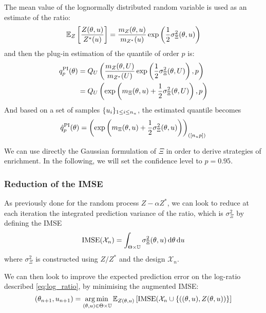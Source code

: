 \documentclass[../../Main_ManuscritThese.tex]{subfiles}
\begin{document}
The mean value of the lognormally distributed random variable is used
as an estimate of the ratio:
\begin{equation}
  \label{eq:mean_ratio_logn}
\mathbb{E}_Z\left[\frac{Z(\theta, u)}{Z^*(u)}\right] = \frac{m_Z(\theta, u)}{m_{Z^*}(u)}\exp\left(\frac{1}{2}\sigma^2_{\Xi}(\theta, u)\right) 
\end{equation}
and then the plug-in estimation of the quantile of
order $p$ is:
\begin{align}
  {q}^{\mathrm{PI}}_p(\theta) &= Q_{U}\left(\frac{m_Z(\theta, U)}{m_{Z^*}(U)}\exp\left(\frac{1}{2}\sigma^2_{\Xi}(\theta, U)\right),p \right)\\ &= Q_{U}\left(\exp\left(m_{\Xi}(\theta, u)+\frac{1}{2}\sigma^2_{\Xi}(\theta, U)\right),p \right)
\end{align}
And based on a set of samples $\{u_i\}_{1\leq i \leq n_{u}}$, the estimated quantile becomes
\begin{equation}
  \hat{q}^{\mathrm{PI}}_p(\theta) = {\left(\exp\left(m_{\Xi}(\theta, u)+\frac{1}{2}\sigma^2_{\Xi}(\theta, u)\right)\right)}_{\left(\left[n_{u}p\right]\right)}
\end{equation}


We can use directly the Gaussian formulation of $\Xi$ in order to
derive strategies of enrichment. In the following, we will set the
confidence level to $p=0.95$.
  
  \subsubsection{Reduction of the IMSE}
  \label{ssec:reduction_imse_quantile}
  As previously done for the random process $Z - \alpha Z^*$, we can
  look to reduce at each iteration the integrated prediction variance
  of the ratio, which is $\sigma^2_{\Xi}$ by defining the IMSE
\begin{equation}
  \operatorname{\mathrm{IMSE}}(\mathcal{X}_n) = \int_{\Theta\times\mathbb{U}} \sigma_{\Xi}^2(\theta, u) \,\mathrm{d}\theta\,\mathrm{d}u
\end{equation}
where $\sigma_\Xi^2$ is constructed using $Z/Z^*$ and the design $\mathcal{X}_n$.

We can then look to improve the expected prediction error on the
log-ratio described \cref{eq:log_ratio}, by minimising the augmented
IMSE:
\begin{equation}
  \label{eq:aIMSE_Xi}
 (\theta_{n+1}, u_{n+1}) = \operatorname*{arg\,min \,}_{(\theta, u) \in \Theta \times \mathbb{U}}\mathbb{E}_{Z(\theta,u)}\left[\operatorname{\mathrm{IMSE}}(\mathcal{X}_n \cup \left\{\left((\theta, u),Z(\theta, u)\right)\right\}\right]
\end{equation}
\end{document}

